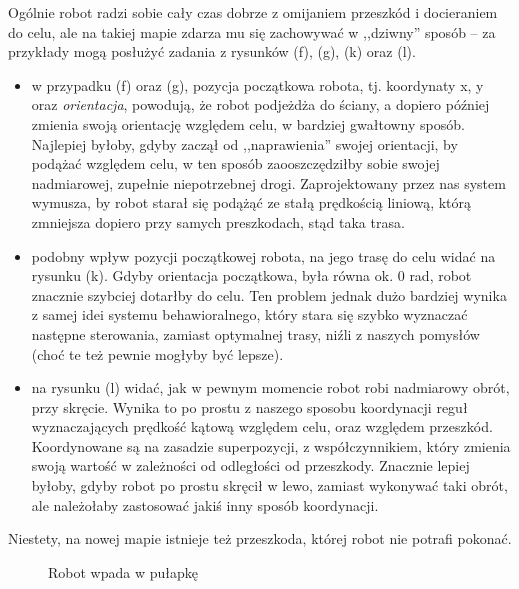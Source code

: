 \documentclass[11pt]{article}
\begin{document}
Ogólnie robot radzi sobie cały czas dobrze z omijaniem przeszkód i docieraniem do celu, ale na takiej mapie zdarza mu się zachowywać w ,,dziwny'' sposób -- za przykłady mogą posłużyć zadania z rysunków (f), (g), (k) oraz (l).
\begin{itemize}[--]
\item w przypadku (f) oraz (g), pozycja początkowa robota, tj. koordynaty x, y oraz \emph{orientacja}, powodują, że robot podjeżdża do ściany, a dopiero później zmienia swoją orientację względem celu, w bardziej gwałtowny sposób. Najlepiej byłoby, gdyby zaczął od ,,naprawienia'' swojej orientacji, by podążać względem celu, w ten sposób zaooszczędziłby sobie swojej nadmiarowej, zupełnie niepotrzebnej drogi. Zaprojektowany przez nas system wymusza, by robot starał się podążąć ze stałą prędkością liniową, którą zmniejsza dopiero przy samych preszkodach, stąd taka trasa.
\item podobny wpływ pozycji początkowej robota, na jego trasę do celu widać na rysunku (k). Gdyby orientacja początkowa, była równa ok. 0 rad, robot znacznie szybciej dotarłby do celu. Ten problem jednak dużo bardziej wynika z samej idei systemu behawioralnego, który stara się szybko wyznaczać następne sterowania, zamiast optymalnej trasy, niźli z naszych pomysłów (choć te też pewnie mogłyby być lepsze).
\item na rysunku (l) widać, jak w pewnym momencie robot robi nadmiarowy obrót, przy skręcie. Wynika to po prostu z naszego sposobu koordynacji reguł wyznaczających prędkość kątową względem celu, oraz względem przeszkód. Koordynowane są na zasadzie superpozycji, z współczynnikiem, który zmienia swoją wartość w zależności od odległości od przeszkody. Znacznie lepiej byłoby, gdyby robot po prostu skręcił w lewo, zamiast wykonywać taki obrót, ale należołaby zastosować jakiś inny sposób koordynacji.
\end{itemize}

Niestety, na nowej mapie istnieje też przeszkoda, której robot nie potrafi pokonać.

\begin{figure}[h!]
	\centering
	
	\hfill
	\hfill
	\hfill
	
	\caption{Robot wpada w pułapkę}
\end{figure}
\end{document}
